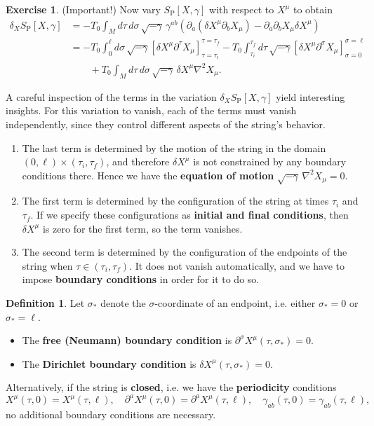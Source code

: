 \documentclass{report}
\theoremstyle{plain}
\theoremstyle{definition}
\newtheorem{definition}[theorem]{Definition}
\newtheorem{exercise}{Exercise}[section]
\theoremstyle{remark}
\newcommand{\di}{\partial}
\begin{document}
\begin{exercise} (Important!)
  Now vary $S_{\text{P}}[X, \gamma]$ with respect to $X^\mu$ to obtain
  \begin{align*}
    \delta_X S_{\text{P}}[X, \gamma]
    &= -T_0 \int_M d\tau \, d\sigma \, \sqrt{-\gamma} \, \gamma^{ab} \left(\di_a(\delta X^\mu \di_b X_\mu) - \di_a \di_b X_\mu \delta X^\mu\right) \\
    &= -T_0 \int_0^{\ell} d\sigma \, \sqrt{-\gamma} \left[\delta X^\mu \di^\tau X_\mu\right]_{\tau=\tau_i}^{\tau=\tau_f} - T_0 \int_{\tau_i}^{\tau_f} d\tau \, \sqrt{-\gamma} \left[\delta X^\mu \di^\sigma X_\mu\right]_{\sigma=0}^{\sigma=\ell} \\
    &\qquad + T_0 \int_M d\tau \, d\sigma \, \sqrt{-\gamma} \, \delta X^\mu \nabla^2 X_\mu.
  \end{align*}
\end{exercise}

A careful inspection of the terms in the variation $\delta_X
S_{\text{P}}[X, \gamma]$ yield interesting insights. For this
variation to vanish, each of the terms must vanish independently,
since they control different aspects of the string's behavior.
\begin{enumerate}
\item The last term is determined by the motion of the string in the
  domain $(0, \ell) \times (\tau_i, \tau_f)$, and therefore $\delta
  X^\mu$ is not constrained by any boundary conditions there. Hence we
  have the {\bf equation of motion} $\sqrt{-\gamma} \, \nabla^2 X_\mu
  = 0$.
\item The first term is determined by the configuration of the string
  at times $\tau_i$ and $\tau_f$. If we specify these configurations
  as {\bf initial and final conditions}, then $\delta X^\mu$ is zero
  for the first term, so the term vanishes.
\item The second term is determined by the configuration of the
  endpoints of the string when $\tau \in (\tau_i, \tau_f)$. It does
  not vanish automatically, and we have to impose {\bf boundary
    conditions} in order for it to do so.
\end{enumerate}

\begin{definition}
  Let $\sigma_*$ denote the $\sigma$-coordinate of an endpoint, i.e.
  either $\sigma_* = 0$ or $\sigma_* = \ell$.
  \begin{itemize}
  \item The {\bf free (Neumann) boundary condition} is $\di^\sigma
    X^\mu(\tau, \sigma_*) = 0$.
  \item The {\bf Dirichlet boundary condition} is $\delta X^\mu(\tau,
    \sigma_*) = 0$.
  \end{itemize}
  Alternatively, if the string is {\bf closed}, i.e. we have the {\bf
    periodicity} conditions
  \[ X^\mu(\tau, 0) = X^\mu(\tau, \ell), \quad \di^a X^\mu(\tau, 0) = \di^a X^\mu(\tau, \ell), \quad \gamma_{ab}(\tau, 0) = \gamma_{ab}(\tau, \ell), \]
  no additional boundary conditions are necessary.
\end{definition}
\end{document}
